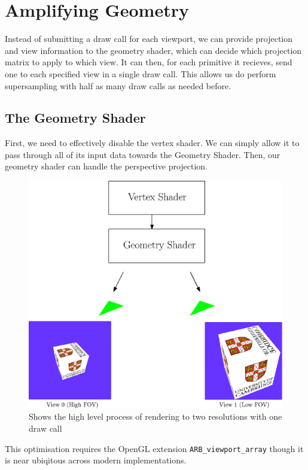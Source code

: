 \documentclass[12pt,a4paper,twoside,openright]{report}
\begin{document}
\section{Amplifying Geometry}

Instead of submitting a draw call for each viewport, we can provide projection and view information to the geometry shader, which can decide which projection matrix to apply to which view. It can then, for each primitive it recieves, send one to each specified view in a single draw call. This allows us do perform supersampling with half as many draw calls as needed before.

\subsection{The Geometry Shader}

First, we need to effectively disable the vertex shader. We can simply allow it to pass through all of its input data towards the Geometry Shader.
Then, our geometry shader can handle the perspective projection.

\begin{figure}[tbh]
\centerline{\includegraphics[scale=0.6]{figs/geoshader.eps}}
\caption{Shows the high level process of rendering to two resolutions with one draw call}
\label{epsfig1}
\end{figure}



This optimisation requires the OpenGL extension \texttt{ARB\_viewport\_array} though it is near ubiqitous across modern implementations.
\end{document}

